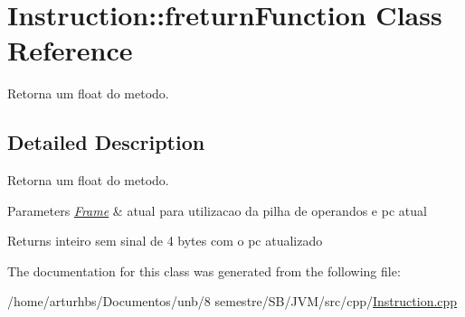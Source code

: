 \hypertarget{classInstruction_1_1freturnFunction}{}\section{Instruction\+:\+:freturn\+Function Class Reference}
\label{classInstruction_1_1freturnFunction}


Retorna um float do metodo.  




\subsection{Detailed Description}
Retorna um float do metodo. 


\begin{DoxyParams}{Parameters}
{\em \hyperlink{classFrame}{Frame}} & atual para utilizacao da pilha de operandos e pc atual \\
\hline
\end{DoxyParams}
\begin{DoxyReturn}{Returns}
inteiro sem sinal de 4 bytes com o pc atualizado 
\end{DoxyReturn}


The documentation for this class was generated from the following file\+:\begin{DoxyCompactItemize}
\item 
/home/arturhbs/\+Documentos/unb/8 semestre/\+S\+B/\+J\+V\+M/src/cpp/\hyperlink{Instruction_8cpp}{Instruction.\+cpp}\end{DoxyCompactItemize}
